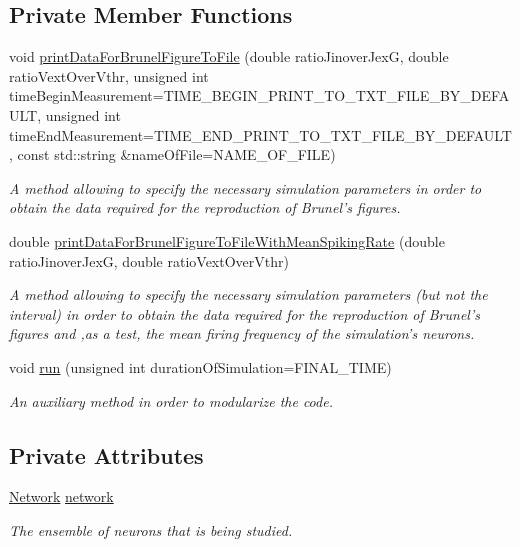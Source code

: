 \subsection*{Private Member Functions}
\begin{DoxyCompactItemize}
\item 
void \hyperlink{classSimulation_ace8912fc809b3503c9a7e769d97cd7cb}{print\-Data\-For\-Brunel\-Figure\-To\-File} (double ratio\-Jinover\-Jex\-G, double ratio\-Vext\-Over\-Vthr, unsigned int time\-Begin\-Measurement=T\-I\-M\-E\-\_\-\-B\-E\-G\-I\-N\-\_\-\-P\-R\-I\-N\-T\-\_\-\-T\-O\-\_\-\-T\-X\-T\-\_\-\-F\-I\-L\-E\-\_\-\-B\-Y\-\_\-\-D\-E\-F\-A\-U\-L\-T, unsigned int time\-End\-Measurement=T\-I\-M\-E\-\_\-\-E\-N\-D\-\_\-\-P\-R\-I\-N\-T\-\_\-\-T\-O\-\_\-\-T\-X\-T\-\_\-\-F\-I\-L\-E\-\_\-\-B\-Y\-\_\-\-D\-E\-F\-A\-U\-L\-T, const std\-::string \&name\-Of\-File=N\-A\-M\-E\-\_\-\-O\-F\-\_\-\-F\-I\-L\-E)
\begin{DoxyCompactList}\small\item\em A method allowing to specify the necessary simulation parameters in order to obtain the data required for the reproduction of Brunel's figures. \end{DoxyCompactList}\item 
double \hyperlink{classSimulation_a48419e2332a7186041433ca3b67fbdab}{print\-Data\-For\-Brunel\-Figure\-To\-File\-With\-Mean\-Spiking\-Rate} (double ratio\-Jinover\-Jex\-G, double ratio\-Vext\-Over\-Vthr)
\begin{DoxyCompactList}\small\item\em A method allowing to specify the necessary simulation parameters (but not the interval) in order to obtain the data required for the reproduction of Brunel's figures and ,as a test, the mean firing frequency of the simulation's neurons. \end{DoxyCompactList}\item 
void \hyperlink{classSimulation_a9c9a1b5e52b447c84977990ebd545f38}{run} (unsigned int duration\-Of\-Simulation=F\-I\-N\-A\-L\-\_\-\-T\-I\-M\-E)
\begin{DoxyCompactList}\small\item\em An auxiliary method in order to modularize the code. \end{DoxyCompactList}\end{DoxyCompactItemize}
\subsection*{Private Attributes}
\begin{DoxyCompactItemize}
\item 
\hypertarget{classSimulation_a7b3ddbe6f43ec8b5fee95f1a5cdedbbe}{\hyperlink{classNetwork}{Network} \hyperlink{classSimulation_a7b3ddbe6f43ec8b5fee95f1a5cdedbbe}{network}}\label{classSimulation_a7b3ddbe6f43ec8b5fee95f1a5cdedbbe}

\begin{DoxyCompactList}\small\item\em The ensemble of neurons that is being studied. \end{DoxyCompactList}\end{DoxyCompactItemize}
